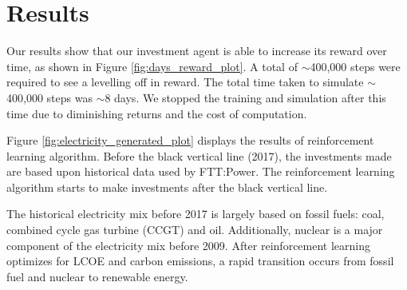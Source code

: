\documentclass{article}
\begin{document}

%



\section{Results}
\label{sec:results}


%

Our results show that our investment agent is able to increase its reward over time, as shown in Figure \ref{fig:days_reward_plot}. A total of ${\sim}$400,000 steps were required to see a levelling off in reward. The total time taken to simulate ${\sim}$400,000 steps was ${\sim}$8 days. We stopped the training and simulation after this time due to diminishing returns and the cost of computation.

Figure \ref{fig:electricity_generated_plot} displays the results of reinforcement learning algorithm. Before the black vertical line (2017), the investments made are based upon historical data used by FTT:Power. The reinforcement learning algorithm starts to make investments after the black vertical line. 


The historical electricity mix before 2017 is largely based on fossil fuels: coal, combined cycle gas turbine (CCGT) and oil. Additionally, nuclear is a major component of the electricity mix before 2009. After reinforcement learning optimizes for LCOE and carbon emissions, a rapid transition occurs from fossil fuel and nuclear to renewable energy. 
\end{document}
